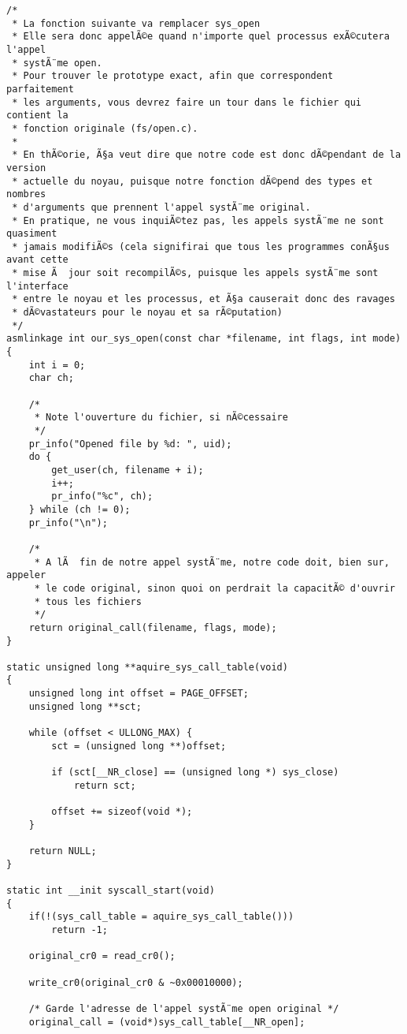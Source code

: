 \documentclass[11pt]{article}
\begin{document}
\begin{verbatim}
/*
 * La fonction suivante va remplacer sys_open
 * Elle sera donc appelÃ©e quand n'importe quel processus exÃ©cutera l'appel
 * systÃ¨me open.
 * Pour trouver le prototype exact, afin que correspondent parfaitement
 * les arguments, vous devrez faire un tour dans le fichier qui contient la
 * fonction originale (fs/open.c).
 *
 * En thÃ©orie, Ã§a veut dire que notre code est donc dÃ©pendant de la version
 * actuelle du noyau, puisque notre fonction dÃ©pend des types et nombres
 * d'arguments que prennent l'appel systÃ¨me original.
 * En pratique, ne vous inquiÃ©tez pas, les appels systÃ¨me ne sont quasiment
 * jamais modifiÃ©s (cela signifirai que tous les programmes conÃ§us avant cette
 * mise Ã  jour soit recompilÃ©s, puisque les appels systÃ¨me sont l'interface
 * entre le noyau et les processus, et Ã§a causerait donc des ravages
 * dÃ©vastateurs pour le noyau et sa rÃ©putation)
 */
asmlinkage int our_sys_open(const char *filename, int flags, int mode)
{
    int i = 0;
    char ch;

    /*
     * Note l'ouverture du fichier, si nÃ©cessaire
     */
    pr_info("Opened file by %d: ", uid);
    do {
        get_user(ch, filename + i);
        i++;
        pr_info("%c", ch);
    } while (ch != 0);
    pr_info("\n");

    /*
     * A lÃ  fin de notre appel systÃ¨me, notre code doit, bien sur, appeler
     * le code original, sinon quoi on perdrait la capacitÃ© d'ouvrir
     * tous les fichiers
     */
    return original_call(filename, flags, mode);
}

static unsigned long **aquire_sys_call_table(void)
{
    unsigned long int offset = PAGE_OFFSET;
    unsigned long **sct;

    while (offset < ULLONG_MAX) {
        sct = (unsigned long **)offset;

        if (sct[__NR_close] == (unsigned long *) sys_close)
            return sct;

        offset += sizeof(void *);
    }

    return NULL;
}

static int __init syscall_start(void)
{
    if(!(sys_call_table = aquire_sys_call_table()))
        return -1;

    original_cr0 = read_cr0();

    write_cr0(original_cr0 & ~0x00010000);

    /* Garde l'adresse de l'appel systÃ¨me open original */
    original_call = (void*)sys_call_table[__NR_open];


\end{verbatim}
\end{document}
